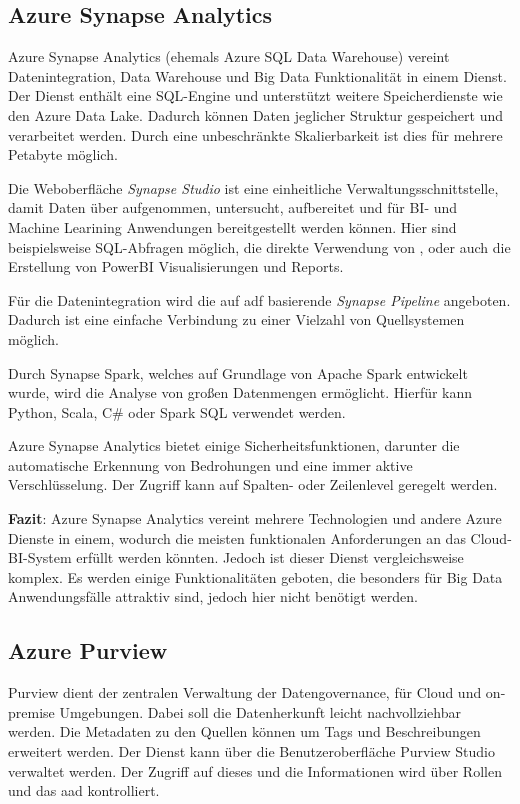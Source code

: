 \subsection{Azure Synapse Analytics} \label{sec:grundlagen:azure_dienste:synapseAnalytics}
Azure Synapse Analytics (ehemals Azure SQL Data Warehouse) vereint Datenintegration, Data Warehouse und Big Data Funktionalität in einem Dienst. Der Dienst enthält eine SQL-Engine und unterstützt weitere Speicherdienste wie den Azure Data Lake. Dadurch können Daten jeglicher Struktur gespeichert und verarbeitet werden. Durch eine unbeschränkte Skalierbarkeit ist dies für mehrere Petabyte möglich.

Die Weboberfläche \textit{Synapse Studio} ist eine einheitliche Verwaltungsschnittstelle, damit Daten über aufgenommen, untersucht, aufbereitet und für BI- und Machine Learining Anwendungen bereitgestellt werden können. Hier sind beispielsweise SQL-Abfragen möglich, die direkte Verwendung von , oder auch die Erstellung von PowerBI Visualisierungen und Reports.

Für die Datenintegration wird die auf \ac{adf} basierende \textit{Synapse Pipeline} angeboten. Dadurch ist eine einfache Verbindung zu einer Vielzahl von Quellsystemen möglich.

Durch Synapse Spark, welches auf Grundlage von Apache Spark entwickelt wurde, wird die Analyse von großen Datenmengen ermöglicht. Hierfür kann Python, Scala, C\# oder Spark SQL verwendet werden.

Azure Synapse Analytics bietet einige Sicherheitsfunktionen, darunter die automatische Erkennung von Bedrohungen und eine immer aktive Verschlüsselung. Der Zugriff kann auf Spalten- oder Zeilenlevel geregelt werden.
\cite{shiyal_beginning_2021}

\textbf{Fazit}: Azure Synapse Analytics vereint mehrere Technologien und andere Azure Dienste in einem, wodurch die meisten funktionalen Anforderungen an das Cloud-BI-System erfüllt werden könnten. Jedoch ist dieser Dienst vergleichsweise komplex. Es werden einige Funktionalitäten geboten, die besonders für Big Data Anwendungsfälle attraktiv sind, jedoch hier nicht benötigt werden.


\subsection{Azure Purview} \label{sec:grundlagen:azure_dienste:purview}
Purview dient der zentralen Verwaltung der Datengovernance, für Cloud und on-premise Umgebungen. Dabei soll die Datenherkunft leicht nachvollziehbar werden. Die Metadaten zu den Quellen können um Tags und Beschreibungen erweitert werden. Der Dienst kann über die Benutzeroberfläche Purview Studio verwaltet werden. Der Zugriff auf dieses und die Informationen wird über Rollen und das \ac{aad} kontrolliert.

